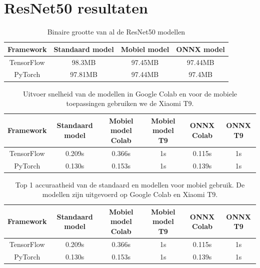\section{ResNet50 resultaten}

\begin{table}[!ht]
    \caption{Binaire grootte van al de ResNet50 modellen}
\begin{tabular}{cccc}
    \hline
    Framework & Standaard model & Mobiel model & ONNX model \\
    \hline
    TensorFlow & 98.3MB & 97.45MB & 97.44MB \\
    PyTorch & 97.81MB & 97.44MB & 97.4MB \\
    \hline
\end{tabular}
\label{tab:class_size}
\end{table}

\begin{table}[!ht]
    \caption{Uitvoer snelheid van de modellen in Google Colab en voor de mobiele toepassingen gebruiken we de Xiaomi T9.}
\begin{tabular}{cccccc}
    \hline
    Framework & Standaard model & Mobiel model Colab & Mobiel model T9 & ONNX Colab & ONNX T9\\
    \hline
    TensorFlow & 0.209s & 0.366s & 1s & 0.115s & 1s \\
    PyTorch & 0.130s & 0.153s & 1s & 0.139s & 1s \\
    \hline
\end{tabular}
\label{tab:class_speed}
\end{table}

\begin{table}[!ht]
    \caption{Top 1 accuraatheid van de standaard en modellen voor mobiel gebruik. De modellen zijn uitgevoerd op Google Colab en Xiaomi T9.}
\begin{tabular}{cccccc}
    \hline
    Framework & Standaard model & Mobiel model Colab & Mobiel model T9 & ONNX Colab & ONNX T9\\
    \hline
    TensorFlow & 0.209s & 0.366s & 1s & 0.115s & 1s \\
    PyTorch & 0.130s & 0.153s & 1s & 0.139s & 1s \\
    \hline
\end{tabular}
\label{tab:class_acc}
\end{table}